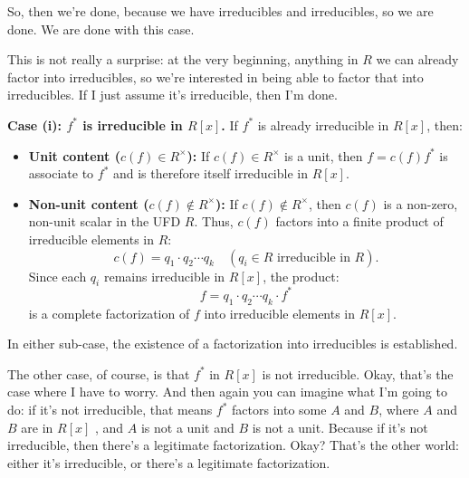\begin{proofWrapper}
\begin{speech}[00:25:57 - 00:27:36]
So, then we're done, because we have irreducibles and irreducibles, so we are done. We are done with this case. 

This is not really a surprise: at the very beginning, anything in $R$ we can already factor into irreducibles, so we're interested in being able to factor that into irreducibles. If I just assume it's irreducible, then I'm done.
\end{speech}

\begin{content}
\textbf{Case (i): $f^*$ is irreducible in $R[x]$.}
If $f^*$ is already irreducible in $R[x]$, then:
\begin{itemize}
    \item \textbf{Unit content ($c(f) \in R^\times$):} If $c(f) \in R^\times$ is a unit, then $f = c(f) f^*$ is associate to $f^*$ and is therefore itself irreducible in $R[x]$.
    \item \textbf{Non-unit content ($c(f) \notin R^\times$):} If $c(f) \notin R^\times$, then $c(f)$ is a non-zero, non-unit scalar in the UFD $R$. Thus, $c(f)$ factors into a finite product of irreducible elements in $R$:
    \[
    c(f) = q_1 \cdot q_2 \cdots q_k \quad (q_i \in R \text{ irreducible in } R).
    \]
    Since each $q_i$ remains irreducible in $R[x]$, the product:
    \[
    f = q_1 \cdot q_2 \cdots q_k \cdot f^*
    \]
    is a complete factorization of $f$ into irreducible elements in $R[x]$.
\end{itemize}
In either sub-case, the existence of a factorization into irreducibles is established.
\end{content}

\begin{speech}[00:27:36 - 00:29:34]
The other case, of course, is that $f^*$ in $R[x]$ is not irreducible.  Okay, that's the case where I have to worry. And then again you can imagine what I'm going to do: if it's not irreducible, that means $f^*$ factors into some $A$ and $B$,  where $A$ and $B$ are in $R[x]$ , and $A$ is not a unit and $B$ is not a unit.  Because if it's not irreducible, then there's a legitimate factorization. Okay? That's the other world: either it's irreducible, or there's a legitimate factorization.


\end{speech}
\end{proofWrapper}
